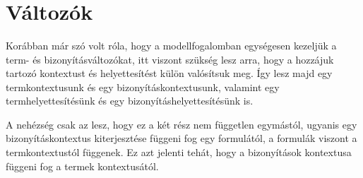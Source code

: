 \begin{code}
\AgdaSymbol{\}}\AgdaSpace{}%
\AgdaSpace{}%
\AgdaSpace{}%
\<%
\\
%
\>[2]\AgdaSpace{}%
\AgdaSymbol{:}\AgdaSpace{}%
\AgdaSymbol{\}}\AgdaSpace{}%
\AgdaSpace{}%
\AgdaSpace{}%
\AgdaSymbol{(}\AgdaSpace{}%
\AgdaSymbol{)}\AgdaSpace{}%
\AgdaSpace{}%
\AgdaSpace{}%
\<%
\\
%
\>[2]%
\>[9]\AgdaSymbol{:}\AgdaSpace{}%
\AgdaSymbol{\}}\AgdaSpace{}%
\AgdaSpace{}%
\AgdaSpace{}%
\AgdaSymbol{(}\AgdaSpace{}%
\AgdaSymbol{)}\AgdaSpace{}%
\AgdaSpace{}%
\AgdaSpace{}%
\<%
\\
%
\>[2]%
\>[9]\AgdaSymbol{:}\AgdaSpace{}%
\AgdaSymbol{\}\{}\AgdaSpace{}%
\AgdaSymbol{:}\AgdaSpace{}%
\AgdaSymbol{\}}\AgdaSpace{}%
\AgdaSpace{}%
\AgdaSpace{}%
\AgdaSpace{}%
\AgdaSpace{}%
\AgdaSpace{}%
\AgdaSpace{}%
\AgdaOperator{\AgdaFunction{\textasciicircum{}}}\AgdaSpace{}%
\AgdaSpace{}%
\AgdaSpace{}%
\AgdaSpace{}%
\<%
\end{code}

\section{Változók}

Korábban már szó volt róla, hogy a modellfogalomban egységesen kezeljük a term- és bizonyításváltozókat, itt viszont szükség lesz arra, hogy a hozzájuk tartozó kontextust és helyettesítést külön valósítsuk meg. Így lesz majd egy termkontextusunk és egy bizonyításkontextusunk, valamint egy termhelyettesítésünk és egy bizonyításhelyettesítésünk is.

A nehézség csak az lesz, hogy ez a két rész nem független egymástól, ugyanis egy bizonyításkontextus kiterjesztése függeni fog egy formulától, a formulák viszont a termkontextustól függenek. Ez azt jelenti tehát, hogy a bizonyítások kontextusa függeni fog a termek kontextusától.

